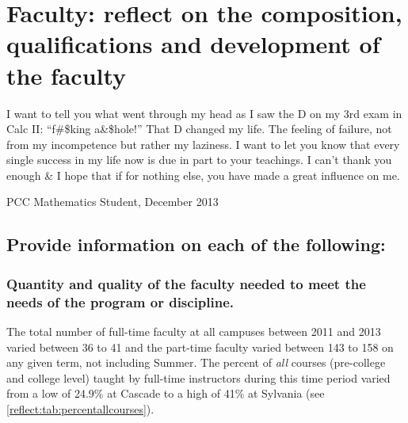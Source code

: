 \chapter[Faculty composition and qualifications]{Faculty:  reflect on the
composition, qualifications and development of the faculty}
\epigraph{ %
I want to tell you what went through my head as I saw the D on my 3rd exam in
Calc II:  ``f\#\$king a\&\$hole!''  That D changed my life.  The feeling of
failure, not from my incompetence but rather my laziness.
I want to let you know that every single success in my life now is due in part
to your teachings.  I can't thank you enough \& I hope that if for nothing
else, you have made a great influence on me.}{PCC Mathematics
Student, December 2013}


\section[Faculty composition]{Provide information on each of the following:}
\subsection[Quantity and quality of the faculty]{Quantity and quality of the faculty needed to meet the needs of the
program or discipline.}
The total number of full-time faculty at all campuses between 2011 and 2013
varied between 36 to 41 and the 
part-time faculty varied between 143 to 158 on any given term,  not including
Summer.     The percent of \emph{all} courses (pre-college and college level)
taught by full-time instructors during this time period varied from a low of
24.9\% at Cascade to a high of 41\% at Sylvania (see
\cref{reflect:tab:percentallcourses}).

